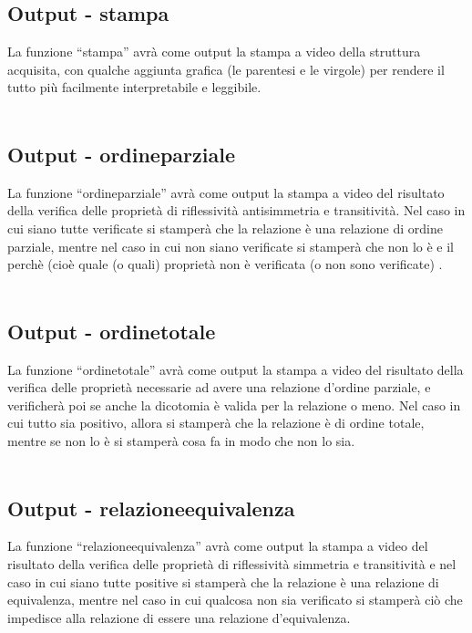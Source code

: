\documentclass[11pt, a4paper, titlepage, block]{article}
\begin{document}
	\subsection{Output - stampa}
	La funzione “stampa” avr\`a  come output la stampa a video della struttura acquisita, con qualche aggiunta grafica (le parentesi e le virgole)  per rendere il tutto pi\`u facilmente interpretabile e leggibile.\\
	\\
	\subsection{Output - ordine\textunderscore parziale}
	La funzione “ordine\textunderscore parziale” avr\`a  come output la stampa a video del risultato della verifica delle propriet\`a  di riflessivit\`a  antisimmetria e transitivit\`a. Nel caso in cui siano tutte verificate si stamper\`a  che la relazione \`e  una relazione di ordine parziale, mentre nel caso in cui non siano verificate si stamper\`a  che non lo \`e  e il perch\`e   (cio\`e  quale (o quali)  propriet\`a  non \`e  verificata (o non sono verificate) .\\
	\\
	\subsection{Output - ordine\textunderscore totale}
	La funzione “ordine\textunderscore totale” avr\`a  come output la stampa a video del risultato della verifica delle propriet\`a  necessarie ad avere una relazione d'ordine parziale, e verificher\`a  poi se anche la dicotomia \`e valida per la relazione o meno. Nel caso in cui tutto sia positivo, allora si stamper\`a  che la relazione \`e  di ordine totale, mentre se non lo \`e  si stamper\`a  cosa fa in modo che non lo sia.\\
	\\
	\subsection{Output - relazione\textunderscore equivalenza}
	La funzione “relazione\textunderscore equivalenza” avr\`a  come output la stampa a video del risultato della verifica delle propriet\`a  di riflessivit\`a  simmetria e transitivit\`a e nel caso in cui siano tutte positive si stamper\`a  che la relazione \`e  una relazione di equivalenza, mentre nel caso in cui qualcosa non sia verificato si stamper\`a ci\`o  che impedisce alla relazione di essere una relazione d'equivalenza.\\
	\\
\end{document}
